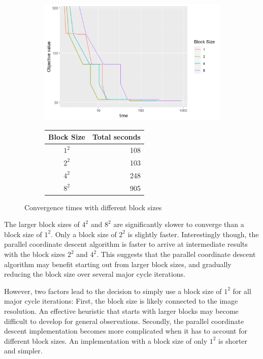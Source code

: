 \begin{figure}[h]
	\centering
	\begin{subfigure}{0.6\linewidth}
		\includegraphics[width=1.0\linewidth]{./chapters/05.pcdm/parameters/blockSize.png}
	\end{subfigure}
	\begin{subfigure}{0.35\linewidth}
		\begin{tabular}{c | r}
			Block Size & Total seconds \\ \hline
			$1^2$ & 108 \\
			$2^2$ & 103 \\
			$4^2$ & 248 \\
			$8^2$ & 905 \\
		\end{tabular}
	\end{subfigure}
	\caption{Convergence times with different block sizes}
	\label{pcdm:results:block}
\end{figure}

The larger block sizes of $4^2$ and $8^2$ are significantly slower to converge than a block size of $1^2$. Only a block size of $2^2$ is slightly faster. Interestingly though, the parallel coordinate descent algorithm is faster to arrive at intermediate results with the block sizes $2^2$ and $4^2$. This suggests that the parallel coordinate descent algorithm may benefit starting out from larger block sizes, and gradually reducing the block size over several major cycle iterations.

However, two factors lead to the decision to simply use a block size of $1^2$ for all major cycle iterations: First, the block size is likely connected to the image resolution. An effective heuristic that starts with larger blocks may become difficult to develop for general observations. Secondly, the parallel coordinate descent implementation becomes more complicated when it has to account for different block sizes. An implementation with a block size of only $1^2$ is shorter and simpler.

